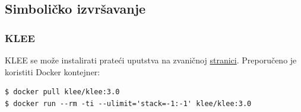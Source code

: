 \subsection{Simboličko izvršavanje}\label{simboliux10dko-izvrux161avanje}

\subsubsection{KLEE}\label{klee}

KLEE se može instalirati prateći uputstva na zvaničnoj \href{https://klee.github.io/getting-started/}{stranici}. Preporučeno je koristiti Docker kontejner:

\begin{verbatim}
$ docker pull klee/klee:3.0
$ docker run --rm -ti --ulimit='stack=-1:-1' klee/klee:3.0
\end{verbatim}
